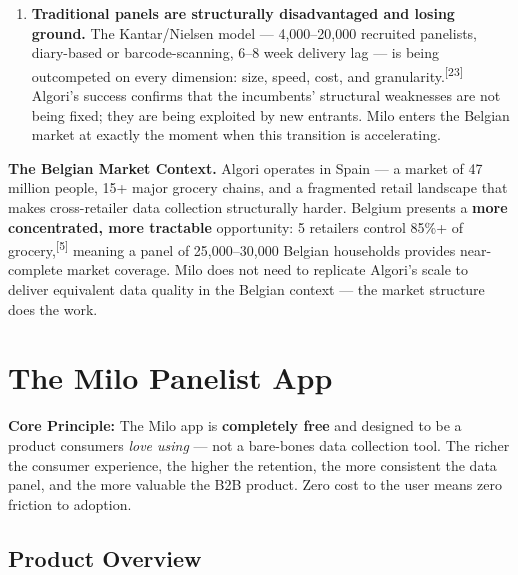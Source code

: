 \documentclass[11pt,a4paper]{article}
\begin{document}
\begin{enumerate}[leftmargin=1.5em, itemsep=6pt]
  \item \textbf{Traditional panels are structurally disadvantaged and losing ground.}
  The Kantar/Nielsen model --- 4,000--20,000 recruited panelists, diary-based or barcode-scanning, 6--8 week delivery lag --- is being outcompeted on every dimension: size, speed, cost, and granularity.\textsuperscript{[23]} Algori's success confirms that the incumbents' structural weaknesses are not being fixed; they are being exploited by new entrants. Milo enters the Belgian market at exactly the moment when this transition is accelerating.

\end{enumerate}

\begin{premiumbox}
\textbf{\color{milodark}The Belgian Market Context.} Algori operates in Spain --- a market of 47 million people, 15+ major grocery chains, and a fragmented retail landscape that makes cross-retailer data collection structurally harder. Belgium presents a \textbf{more concentrated, more tractable} opportunity: 5 retailers control 85\%+ of grocery,\textsuperscript{[5]} meaning a panel of 25,000--30,000 Belgian households provides near-complete market coverage. Milo does not need to replicate Algori's scale to deliver equivalent data quality in the Belgian context --- the market structure does the work.
\end{premiumbox}

\clearpage

\section{The Milo Panelist App}

\begin{alertbox}
\textbf{\color{milodark}Core Principle:} The Milo app is \textbf{completely free} and designed to be a product consumers \emph{love using} --- not a bare-bones data collection tool. The richer the consumer experience, the higher the retention, the more consistent the data panel, and the more valuable the B2B product. Zero cost to the user means zero friction to adoption.
\end{alertbox}

\subsection{Product Overview}
\end{document}

